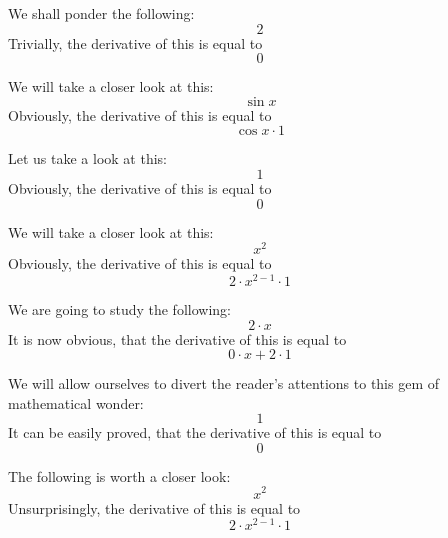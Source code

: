 \documentclass{article}
\begin{document}
We shall ponder the following:
\begin{equation}
2 
\end{equation}
Trivially, the derivative of this is equal to
\begin{equation}
0 
\end{equation}

We will take a closer look at this:
\begin{equation}
\sin x 
\end{equation}
Obviously, the derivative of this is equal to
\begin{equation}
\cos x \cdot 1 
\end{equation}

Let us take a look at this:
\begin{equation}
1 
\end{equation}
Obviously, the derivative of this is equal to
\begin{equation}
0 
\end{equation}

We will take a closer look at this:
\begin{equation}
x ^{2 } 
\end{equation}
Obviously, the derivative of this is equal to
\begin{equation}
2 \cdot x ^{2 - 1 } \cdot 1 
\end{equation}

We are going to study the following:
\begin{equation}
2 \cdot x 
\end{equation}
It is now obvious, that the derivative of this is equal to
\begin{equation}
0 \cdot x + 2 \cdot 1 
\end{equation}

We will allow ourselves to divert the reader's attentions to this gem of mathematical wonder:
\begin{equation}
1 
\end{equation}
It can be easily proved, that the derivative of this is equal to
\begin{equation}
0 
\end{equation}

The following is worth a closer look:
\begin{equation}
x ^{2 } 
\end{equation}
Unsurprisingly, the derivative of this is equal to
\begin{equation}
2 \cdot x ^{2 - 1 } \cdot 1 
\end{equation}
\end{document}
